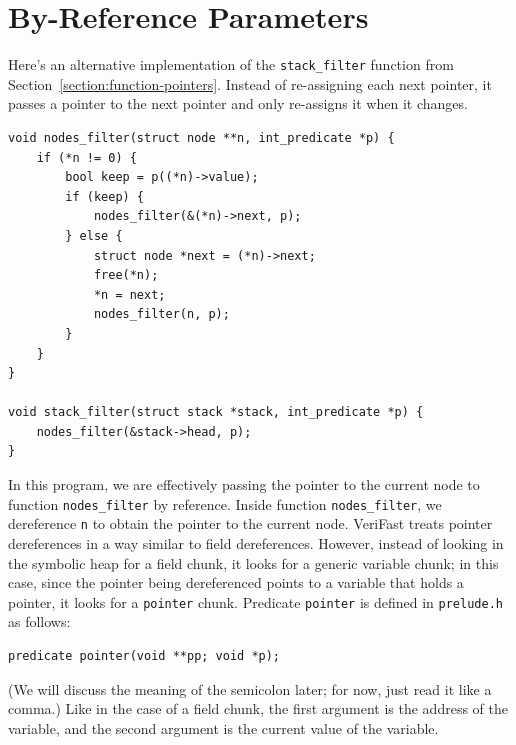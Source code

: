 \documentclass{article}
\begin{document}
\section{By-Reference Parameters}\label{section:byref-params}

Here's an alternative implementation of the
\lstinline!stack_filter! function from
Section~\ref{section:function-pointers}. Instead of
re-assigning each next pointer, it passes a pointer to the next
pointer and only re-assigns it when it changes.
\begin{lstlisting}
void nodes_filter(struct node **n, int_predicate *p) {
    if (*n != 0) {
        bool keep = p((*n)->value);
        if (keep) {
            nodes_filter(&(*n)->next, p);
        } else {
            struct node *next = (*n)->next;
            free(*n);
            *n = next;
            nodes_filter(n, p);
        }
    }
}

void stack_filter(struct stack *stack, int_predicate *p) {
    nodes_filter(&stack->head, p);
}
\end{lstlisting}
In this program, we are effectively passing the pointer to the
current node to function \lstinline!nodes_filter! by reference.
Inside function \lstinline!nodes_filter!, we dereference
\lstinline!n! to obtain the pointer to the current node.
VeriFast treats pointer dereferences in a way similar to field
dereferences. However, instead of looking in the symbolic heap
for a field chunk, it looks for a generic variable chunk; in
this case, since the pointer being dereferenced points to a
variable that holds a pointer, it looks for a
\lstinline!pointer! chunk. Predicate \lstinline!pointer! is
defined in \texttt{prelude.h} as follows:
\begin{lstlisting}
predicate pointer(void **pp; void *p);
\end{lstlisting}
(We will discuss the meaning of the semicolon later; for now,
just read it like a comma.) Like in the case of a field chunk,
the first argument is the address of the variable, and the
second argument is the current value of the variable.
\end{document}
